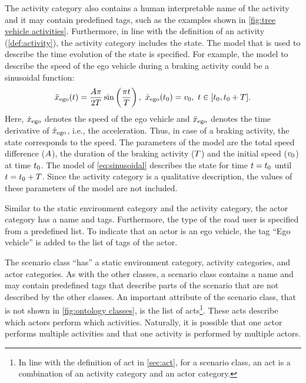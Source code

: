 \cbstart
The activity category also contains a human interpretable name of the activity and it may contain predefined tags, such as the examples shown in \cref{fig:tree vehicle activities}. Furthermore, in line with the definition of an activity (\cref{def:activity}), the activity category includes the state.  The model that is used to describe the time evolution of the state is specified. For example, the model to describe the speed of the ego vehicle during a braking activity could be a sinusoidal function:
\cbstartc
\begin{equation} \label{eq:sinusoidal}
	\ddot{x}_{\mathrm{ego}}(t) = \frac{A \pi}{2T} \sin \left( \frac{\pi t}{T} \right),\ \dot{x}_{\mathrm{ego}}(t_{0}) = v_{0},\ t \in [t_{0}, t_{0}+T].
\end{equation}
Here, $\dot{x}_{\mathrm{ego}}$ denotes the speed of the ego vehicle and $\ddot{x}_{\mathrm{ego}}$ denotes the time derivative of $\dot{x}_{\mathrm{ego}}$, i.e., the acceleration. Thus, in case of a braking activity, the state corresponds to the speed. 
The parameters of the model are the total speed difference ($A$), the duration of the braking activity ($T$) and the initial speed ($v_{0}$) at time $t_{0}$. 
\cbstart
The model of \cref{eq:sinusoidal} describes the state for time $t=t_{0}$ until $t=t_{0}+T$. Since the activity category is a qualitative description, the values of these parameters of the model are not included.
\cbend

Similar to the static environment category and the activity category, the actor category has a name and tags. Furthermore, the type of the road user is specified from a predefined list. To indicate that an actor is an ego vehicle, the tag ``Ego vehicle'' is added to the list of tags of the actor.

The scenario class ``has'' a static environment category, activity categories, and actor categories. As with the other classes, a scenario class contains a name and may contain predefined tags that describe parts of the scenario that are not described by the other classes. An important attribute of the scenario class, that is not shown in \cref{fig:ontology classes}, is the list of acts\cbstart\footnote{\cbstartc In line with the definition of act in \cref{sec:act}, for a scenario class, an act is a combination of an activity category and an actor category.\cbend}\cbend. These acts describe which actors perform which activities. Naturally, it is possible that one actor performs multiple activities and that one activity is performed by multiple actors.

